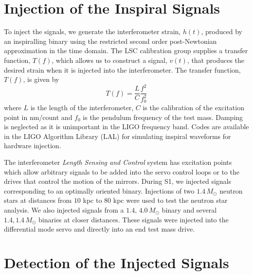 \section{Injection of the Inspiral Signals}
\label{s:injecting}

To inject the signals, we generate the interferometer strain, $h(t)$, produced
by an inspiralling binary using the restricted second order post-Newtonian
approximation in the time domain\cite{biww}.  The LSC calibration group
supplies a transfer function, $T(f)$, which allows us to construct a signal,
$v(t)$, that produces the desired strain when it is injected into the
interferometer.  The transfer function, $T(f)$, is given by \begin{equation}
T(f) = \frac{L}{C}\frac{f^2}{f_0^2}
\end{equation}
where $L$ is the length of the interferometer, $C$ is the calibration of the
excitation point in nm/count and $f_0$ is the pendulum frequency of the test
mass. Damping is neglected as it is unimportant in the LIGO frequency band.
Codes are available in the LIGO Algorithm Library (LAL)\cite{lal} for
simulating inspiral waveforms for hardware injection.

The interferometer \emph{Length Sensing and Control} system\cite{abbott2003a}
has excitation points which allow arbitrary signals to be added into the servo
control loops or to the drives that control the motion of the
mirrors\cite{shawhan2002}. 
During S1, we injected signals corresponding to an optimally oriented binary.
Injections of two $1.4\,M_\odot$ neutron stars at distances from $10$ kpc to
$80$ kpc were used to test the neutron star analysis. 
We also injected signals from a $1.4,\,4.0\,M_\odot$ binary and several
$1.4,1.4\,M_\odot$ binaries at closer distances.  These signals were injected
into the differential mode servo and directly into an end test mass drive.


\section{Detection of the Injected Signals}
\label{s:detection}

